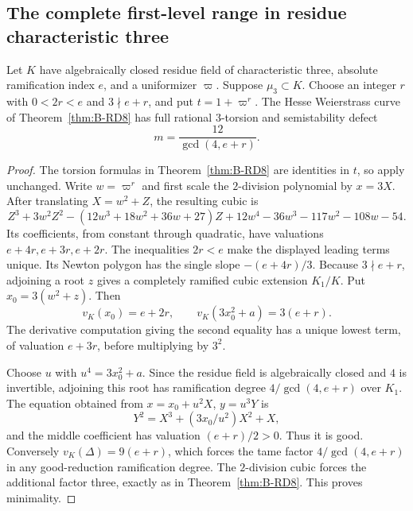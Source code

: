 \subsection{The complete first-level range in residue characteristic three}

\begin{lemma}\label{lem:B-RD9}
Let $K$ have algebraically closed residue field of characteristic three,
absolute ramification index $e$, and a uniformizer $\varpi$. Suppose
$\mu_3\subset K$. Choose an integer $r$ with
$0<2r<e$ and $3\nmid e+r$, and put $t=1+\varpi^r$. The Hesse
Weierstrass curve of Theorem~\ref{thm:B-RD8} has full rational
$3$-torsion and semistability defect
\[
 m=\frac{12}{\gcd(4,e+r)}.
\]
\end{lemma}
\begin{proof}
The torsion formulas in Theorem~\ref{thm:B-RD8} are identities in $t$,
so apply unchanged. Write $w=\varpi^r$ and first scale the $2$-division
polynomial by $x=3X$. After translating $X=w^2+Z$, the resulting cubic is
\[
 Z^3+3w^2Z^2-(12w^3+18w^2+36w+27)Z
       +12w^4-36w^3-117w^2-108w-54.
\]
Its coefficients, from constant through quadratic, have valuations
$e+4r,e+3r,e+2r$. The inequalities $2r<e$ make the displayed leading
terms unique. Its Newton polygon has the single slope
$-(e+4r)/3$. Because $3\nmid e+r$, adjoining a root $z$ gives a
completely ramified cubic extension $K_1/K$. Put $x_0=3(w^2+z)$.
Then
\[
 v_K(x_0)=e+2r,\qquad v_K(3x_0^2+a)=3(e+r).
\]
The derivative computation giving the second equality has a unique
lowest term, of valuation $e+3r$, before multiplying by $3^2$.

Choose $u$ with $u^4=3x_0^2+a$. Since the residue field is algebraically
closed and $4$ is invertible, adjoining this root has ramification
degree $4/\gcd(4,e+r)$ over $K_1$. The equation obtained from
$x=x_0+u^2X$, $y=u^3Y$ is
\[
 Y^2=X^3+(3x_0/u^2)X^2+X,
\]
and the middle coefficient has valuation $(e+r)/2>0$. Thus it is good.
Conversely $v_K(\Delta)=9(e+r)$, which forces the tame factor
$4/\gcd(4,e+r)$ in any good-reduction ramification degree. The
$2$-division cubic forces the additional factor three, exactly as in
Theorem~\ref{thm:B-RD8}. This proves minimality.
\end{proof}

